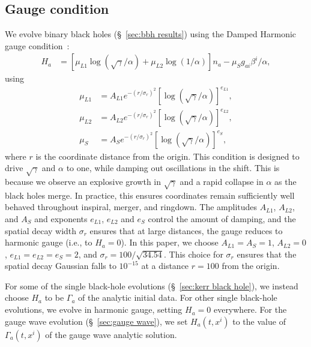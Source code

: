 \begin{bibunit}[unsrtnat]
\subsection{Gauge condition}\label{sec:dh_gauge}
We evolve binary black holes (\S~\ref{sec:bbh results}) using the Damped Harmonic
gauge condition~\cite{Szilagyi:2009qz, Deppe2018:uye}:
\begin{align}\label{eq:dh_gauge_source}
  H_a &= \left[\mu_{L1} \log\left(\sqrt{\gamma}/\alpha\right) + \mu_{L2}
          \log\left(1/\alpha\right)\right] n_a - \mu_S g_{ai} \beta^i / \alpha,
\end{align}
using
\begin{align}
  \label{eq:dh_mu1}
  \mu_{L1} &= A_{L1} e^{-(r/\sigma_r)^2}
               \left[\log(\sqrt{\gamma}/\alpha)\right]^{e_{L1}},\\
  \label{eq:dh_mu2}
  \mu_{L2} &= A_{L2} e^{-(r/\sigma_r)^2}
               \left[\log(\sqrt{\gamma}/\alpha)\right]^{e_{L2}},\\
  \label{eq:dh_mu3}
  \mu_{S} &= A_{S} e^{-(r/\sigma_r)^2}
              \left[\log(\sqrt{\gamma}/\alpha)\right]^{e_{S}},
\end{align} where $r$ is the coordinate distance from the origin. This
condition is designed to drive $\sqrt{\gamma}$ and $\alpha$ to one, while damping
out oscillations in the shift. This is because we observe an explosive growth in
$\sqrt{\gamma}$ and a rapid collapse in $\alpha$ as the black holes merge. In
practice, this ensures coordinates remain sufficiently well behaved throughout
inspiral, merger, and ringdown. The amplitudes $A_{L1}$, $A_{L2}$, and $A_{S}$ and
exponents $e_{L1}$, $e_{L2}$ and $e_{S}$ control the amount of damping, and the
spatial decay width $\sigma_r$ ensures that at large distances, the gauge reduces
to harmonic gauge (i.e., to $H_a = 0$). In this paper, we choose
$A_{L1}=A_S = 1$, $A_{L2}=0$, $e_{L1}=e_{L2}=e_{S}=2$, and $\sigma_r = 100 /
\sqrt{34.54}$. This choice for $\sigma_r$ ensures that the spatial decay
Gaussian falls to $10^{-15}$ at a distance $r=100$ from the origin.

For some of the single black-hole evolutions (\S~\ref{sec:kerr black hole}), we
instead choose $H_a$ to be $\Gamma_a$ of the analytic initial data. For other
single black-hole evolutions, we evolve in harmonic gauge, setting $H_a=0$
everywhere.  For the gauge wave evolution (\S~\ref{sec:gauge wave}), we set
$H_a(t, x^i)$ to the value of $\Gamma_a(t, x^i)$ of the gauge wave analytic
solution.


\end{bibunit}

